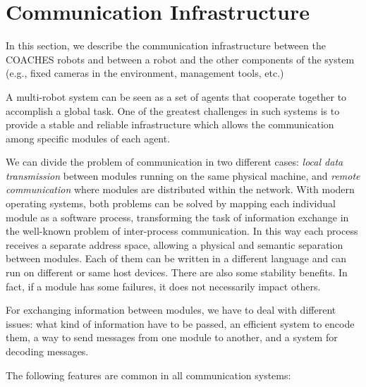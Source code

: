 \section{Communication Infrastructure}


In this section, we describe the communication infrastructure between the COACHES robots and between a robot and the other components of the system (e.g., fixed cameras in the environment, management tools, etc.)

A multi-robot system can be seen as a set of agents that cooperate together to accomplish a global task. %
One of the greatest challenges in such systems is to provide a stable and reliable infrastructure which allows the communication among specific modules of each agent.

We can divide the problem of communication in two different cases: \emph{local data transmission} between  modules running on the same physical machine, and \emph{remote communication} where modules are distributed within the network.
With modern operating systems, both problems can be solved by mapping each individual module as a software process, transforming the task of information exchange in the well-known problem of inter-process communication. In this way each process receives a separate address space, allowing a physical and semantic separation between modules. Each of them can be written in a different language and can run on different or same host devices. There are also some stability benefits. In fact, if a module has some failures, it does not necessarily impact others. 

For exchanging information between modules, we have to deal with different issues: what kind of information have to be passed, an efficient system to encode them, a way to send messages from one module to another, and a system for decoding messages.

The following features are common in all communication systems:

